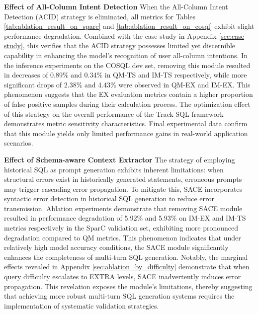 \documentclass[11pt]{article}
\begin{document}
\vspace{4pt}
\noindent\textbf{Effect of All-Column Intent Detection} When the All-Column Intent Detection (ACID) strategy is eliminated, all metrics for Tables \ref{tab:ablation_result_on_sparc} and \ref{tab:ablation_result_on_cosql} exhibit slight performance degradation. Combined with the case study in Appendix \ref{sec:case study}, this verifies that the ACID strategy possesses limited yet discernible capability in enhancing the model's recognition of user all-column intentions. In the inference experiments on the COSQL dev set, removing this module resulted in decreases of 0.89\% and 0.34\% in QM-TS and IM-TS respectively, while more significant drops of 2.38\% and 4.43\% were observed in QM-EX and IM-EX. This phenomenon suggests that the EX evaluation metrics contain a higher proportion of false positive samples during their calculation process. The optimization effect of this strategy on the overall performance of the Track-SQL framework demonstrates metric sensitivity characteristics. Final experimental data confirm that this module yields only limited performance gains in real-world application scenarios.



\vspace{4pt}
\noindent\textbf{Effect of Schema-aware Context Extractor} The strategy of employing historical SQL as prompt generation exhibits inherent limitations: when structural errors exist in historically generated statements, erroneous prompts may trigger cascading error propagation. To mitigate this, SACE incorporates syntactic error detection in historical SQL generation to reduce error transmission. Ablation experiments demonstrate that removing SACE module resulted in performance degradation of 5.92\% and 5.93\% on IM-EX and IM-TS metrics respectively in the SparC validation set, exhibiting more pronounced degradation compared to QM metrics. This phenomenon indicates that under relatively high model accuracy conditions, the SACE module significantly enhances the completeness of multi-turn SQL generation. Notably, the marginal effects revealed in Appendix \ref{sec:ablation_by_difficulty} demonstrate that when query difficulty escalates to EXTRA levels, SACE inadvertently induces error propagation. This revelation exposes the module's limitations, thereby suggesting that achieving more robust multi-turn SQL generation systems requires the implementation of systematic validation strategies.
\end{document}
